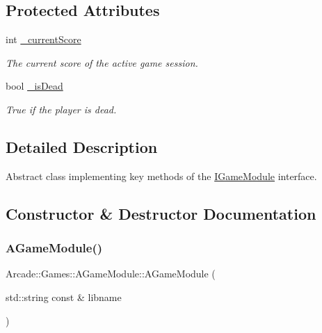 \subsection*{Protected Attributes}
\begin{DoxyCompactItemize}
\item 
\mbox{\label{classArcade_1_1Games_1_1AGameModule_aec19427e257bb35879871c6853f51a8f}} 
int \mbox{\hyperlink{classArcade_1_1Games_1_1AGameModule_aec19427e257bb35879871c6853f51a8f}{\+\_\+current\+Score}}
\begin{DoxyCompactList}\small\item\em The current score of the active game session. \end{DoxyCompactList}\item 
\mbox{\label{classArcade_1_1Games_1_1AGameModule_a0f22ebc10582d404cf7393d8028cb0c2}} 
bool \mbox{\hyperlink{classArcade_1_1Games_1_1AGameModule_a0f22ebc10582d404cf7393d8028cb0c2}{\+\_\+is\+Dead}}
\begin{DoxyCompactList}\small\item\em True if the player is dead. \end{DoxyCompactList}\end{DoxyCompactItemize}


\subsection{Detailed Description}
Abstract class implementing key methods of the \mbox{\hyperlink{classArcade_1_1Games_1_1IGameModule}{I\+Game\+Module}} interface. 

\subsection{Constructor \& Destructor Documentation}
\mbox{\label{classArcade_1_1Games_1_1AGameModule_a489ae3b9ad35cf20ee05be8e3f365a99}} 
\subsubsection{\texorpdfstring{AGameModule()}{AGameModule()}}
{\footnotesize\ttfamily Arcade\+::\+Games\+::\+A\+Game\+Module\+::\+A\+Game\+Module (\begin{DoxyParamCaption}\item[{std\+::string const \&}]{libname }\end{DoxyParamCaption})}




